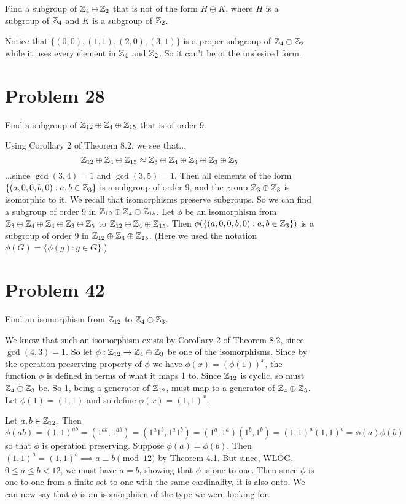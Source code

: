 \documentclass{article}
\begin{document}
Find a subgroup of $\mathbb{Z}_4\oplus\mathbb{Z}_2$ that is not of the form $H\oplus K$,
where $H$ is a subgroup of $\mathbb{Z}_4$ and $K$ is a subgroup of $\mathbb{Z}_2$.

Notice that $\{(0,0),(1,1),(2,0),(3,1)\}$ is a proper subgroup of
$\mathbb{Z}_4\oplus\mathbb{Z}_2$ while it uses every element in $\mathbb{Z}_4$ and $\mathbb{Z}_2$.
So it can't be of the undesired form.

\section*{Problem 28}

Find a subgroup of $\mathbb{Z}_{12}\oplus\mathbb{Z}_4\oplus\mathbb{Z}_{15}$ that is of order 9.

Using Corollary 2 of Theorem 8.2, we see that...
\begin{equation*}
\mathbb{Z}_{12}\oplus\mathbb{Z}_4\oplus\mathbb{Z}_{15}\approx\mathbb{Z}_3\oplus\mathbb{Z}_4\oplus\mathbb{Z}_4\oplus\mathbb{Z}_3\oplus\mathbb{Z}_5
\end{equation*}
...since $\gcd(3,4)=1$ and $\gcd(3,5)=1$.
Then all elements of the form $\{(a,0,0,b,0):a,b\in\mathbb{Z}_3\}$ is a subgroup of order 9, and
the group $\mathbb{Z}_3\oplus\mathbb{Z}_3$ is isomorphic to it.  We recall that isomorphisms
preserve subgroups.  So we can find a subgroup of order 9 in $\mathbb{Z}_{12}\oplus\mathbb{Z}_4\oplus\mathbb{Z}_{15}$.
Let $\phi$ be an isomorphism from $\mathbb{Z}_3\oplus\mathbb{Z}_4\oplus\mathbb{Z}_4\oplus\mathbb{Z}_3\oplus\mathbb{Z}_5$ to
$\mathbb{Z}_{12}\oplus\mathbb{Z}_4\oplus\mathbb{Z}_{15}$.  Then $\phi(\{(a,0,0,b,0):a,b\in\mathbb{Z}_3\})$ is a subgroup
of order 9 in $\mathbb{Z}_{12}\oplus\mathbb{Z}_4\oplus\mathbb{Z}_{15}$.  (Here we used the notation
$\phi(G)=\{\phi(g):g\in G\}$.)

\section*{Problem 42}

Find an isomorphism from $\mathbb{Z}_{12}$ to $\mathbb{Z}_4\oplus\mathbb{Z}_3$.

We know that such an isomorphism exists by Corollary 2 of Theorem 8.2,
since $\gcd(4,3)=1$.
So let $\phi:\mathbb{Z}_{12}\to\mathbb{Z}_4\oplus\mathbb{Z}_3$ be one of the isomorphisms.
Since by the operation preserving property of $\phi$ we
have $\phi(x)=(\phi(1))^x$, the function $\phi$ is defined in terms
of what it maps 1 to.
Since $\mathbb{Z}_{12}$ is cyclic, so must $\mathbb{Z}_4\oplus\mathbb{Z}_3$ be.  So 1, being
a generator of $\mathbb{Z}_{12}$, must map to a generator of $\mathbb{Z}_4\oplus\mathbb{Z}_3$.
Let $\phi(1)=(1,1)$ and so define $\phi(x)=(1,1)^x$.

Let $a,b\in\mathbb{Z}_{12}$.  Then
$\phi(ab)=(1,1)^{ab}=(1^{ab},1^{ab})=(1^a1^b,1^a1^b)=(1^a,1^a)(1^b,1^b)=(1,1)^a(1,1)^b=\phi(a)\phi(b)$
so that $\phi$ is operation preserving.
Suppose $\phi(a)=\phi(b)$.  Then $(1,1)^a=(1,1)^b\implies a\equiv b\pmod{12}$
by Theorem 4.1.  But since, WLOG, $0\leq a\leq b<12$, we must have $a=b$,
showing that $\phi$ is one-to-one.  Then since $\phi$ is one-to-one from
a finite set to one with the same cardinality, it is also onto.  We can
now say that $\phi$ is an isomorphism of the type we were looking for.
\end{document}

